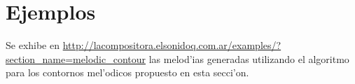 \begin{imagen}
    \width{10cm}
\end{imagen}

\section{Ejemplos}
Se exhibe en \url{http://lacompositora.elsonidoq.com.ar/examples/?section_name=melodic_contour} las melod'ias generadas utilizando
el algoritmo para los contornos mel'odicos propuesto en esta secci'on.
